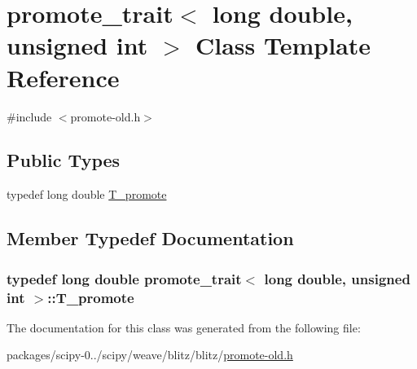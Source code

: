 \hypertarget{classpromote__trait_3_01long_01double_00_01unsigned_01int_01_4}{}\section{promote\+\_\+trait$<$ long double, unsigned int $>$ Class Template Reference}
\label{classpromote__trait_3_01long_01double_00_01unsigned_01int_01_4}


{\ttfamily \#include $<$promote-\/old.\+h$>$}

\subsection*{Public Types}
\begin{DoxyCompactItemize}
\item 
typedef long double \hyperlink{classpromote__trait_3_01long_01double_00_01unsigned_01int_01_4_a27ad061c3b5e27e4c7ad3c3159f932ac}{T\+\_\+promote}
\end{DoxyCompactItemize}


\subsection{Member Typedef Documentation}
\hypertarget{classpromote__trait_3_01long_01double_00_01unsigned_01int_01_4_a27ad061c3b5e27e4c7ad3c3159f932ac}{}
\subsubsection[{T\+\_\+promote}]{\setlength{\rightskip}{0pt plus 5cm}typedef long double {\bf promote\+\_\+trait}$<$ long double, unsigned int $>$\+::{\bf T\+\_\+promote}}\label{classpromote__trait_3_01long_01double_00_01unsigned_01int_01_4_a27ad061c3b5e27e4c7ad3c3159f932ac}


The documentation for this class was generated from the following file\+:\begin{DoxyCompactItemize}
\item 
packages/scipy-\/0../scipy/weave/blitz/blitz/\hyperlink{promote-old_8h}{promote-\/old.\+h}\end{DoxyCompactItemize}
